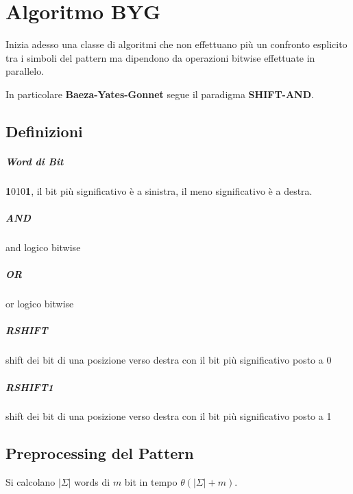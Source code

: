 \chapter{Algoritmo BYG}

Inizia adesso una classe di algoritmi che non effettuano pi\`u un confronto esplicito tra i simboli del pattern ma dipendono da operazioni bitwise effettuate in parallelo.

In particolare \textbf{Baeza-Yates-Gonnet} segue il paradigma \textbf{SHIFT-AND}.

\section{Definizioni}

\paragraph{Word di Bit} \textbf{1}010\textbf{1}, il bit pi\`u significativo \`e a sinistra, il meno significativo \`e a destra.

\paragraph{AND} and logico bitwise

\paragraph{OR} or logico bitwise

\paragraph{RSHIFT} shift dei bit di una posizione verso destra con il bit pi\`u significativo posto a 0

\paragraph{RSHIFT1} shift dei bit di una posizione verso destra con il bit pi\`u significativo posto a 1

\section{Preprocessing del Pattern}

Si calcolano $|\Sigma|$ words di $m$ bit in tempo $\theta(|\Sigma|+m)$.

